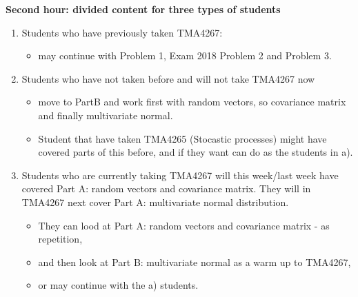 \documentclass[ignorenonframetext,]{beamer}
\providecommand{\tightlist}{%
  \setlength{\itemsep}{0pt}\setlength{\parskip}{0pt}}
\begin{document}
\begin{frame}

\textbf{Second hour: divided content for three types of students}

\begin{enumerate}
\def\labelenumi{\alph{enumi})}
\tightlist
\item
  Students who have previously taken TMA4267:

  \begin{itemize}
  \tightlist
  \item
    may continue with Problem 1, Exam 2018 Problem 2 and Problem 3.
  \end{itemize}
\item
  Students who have not taken before and will not take TMA4267 now

  \begin{itemize}
  \tightlist
  \item
    move to PartB and work first with random vectors, so covariance
    matrix and finally multivariate normal.
  \item
    Student that have taken TMA4265 (Stocastic processes) might have
    covered parts of this before, and if they want can do as the
    students in a).
  \end{itemize}
\item
  Students who are currently taking TMA4267 will this week/last week
  have covered Part A: random vectors and covariance matrix. They will
  in TMA4267 next cover Part A: multivariate normal distribution.

  \begin{itemize}
  \tightlist
  \item
    They can lood at Part A: random vectors and covariance matrix - as
    repetition,
  \item
    and then look at Part B: multivariate normal as a warm up to
    TMA4267,
  \item
    or may continue with the a) students.
  \end{itemize}
\end{enumerate}

\end{frame}
\end{document}
